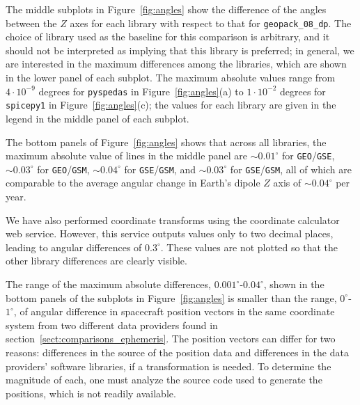 \documentclass[draft]{agujournal2019}
\begin{document}
The middle subplots in Figure~\ref{fig:angles} show the difference of the angles between the $Z$ axes for each library with respect to that for \texttt{geopack\_08\_dp}. The choice of library used as the baseline for this comparison is arbitrary, and it should not be interpreted as implying that this library is preferred; in general, we are interested in the maximum differences among the libraries, which are shown in the lower panel of each subplot. The maximum absolute values  range from $4\cdot 10^{-9}$ degrees for \texttt{pyspedas} in Figure~\ref{fig:angles}(a) to $1\cdot 10^{-2}$ degrees for \texttt{spicepy1} in Figure~\ref{fig:angles}(c); the values for each library are given in the legend in the middle panel of each subplot. 


The bottom panels of Figure~\ref{fig:angles} shows that across all libraries, the maximum absolute value of lines in the middle panel are ${\sim}0.01^\circ$ for \texttt{GEO}/\texttt{GSE}, ${\sim} 0.03^\circ$ for \texttt{GEO}/\texttt{GSM}, ${\sim}0.04^\circ$ for \texttt{GSE}/\texttt{GSM}, and ${\sim}0.03^\circ$ for \texttt{GSE}/\texttt{GSM}, all of which are comparable to the average angular change in Earth's dipole $Z$ axis of ${\sim}0.04^\circ$ per year.

We have also performed coordinate transforms using the  coordinate calculator web service. However, this service outputs values only to two decimal places, leading to angular differences of $0.3^\circ$. These values are not plotted so that the other library differences are clearly visible.

The range of the maximum absolute differences, $0.001^\circ$-$0.04^\circ$, shown in the bottom panels of the subplots in Figure~\ref{fig:angles} is smaller than the range, $0^\circ$-$1^\circ$, of angular difference in spacecraft position vectors in the same coordinate system from two different data providers found in section~\ref{sect:comparisons_ephemeris}. The position vectors can differ for two reasons: differences in the source of the position data and differences in the data providers' software libraries, if a transformation is needed. To determine the magnitude of each, one must analyze the source code used to generate the positions, which is not readily available.
\end{document}

